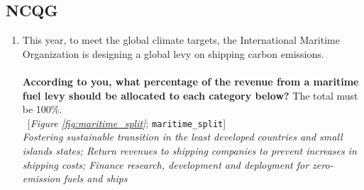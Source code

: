  \subsection*{NCQG} 
 \begin{enumerate}[resume] 
\item  \label{q:maritime_split} This year, to meet the global climate targets, the International Maritime Organization is designing a global levy on shipping carbon emissions.\\\\\textbf{According to you, what percentage of the revenue from a maritime fuel levy should be allocated to each category below?} The total must be 100\%.\\ 
~[\textit{Figure \ref{fig:maritime_split}}; 
\verb|maritime_split|]
  \\ \textit{Fostering sustainable transition in the least developed countries and small islands states; Return revenues to shipping companies to prevent increases in shipping costs; Finance research, development and deployment for zero-emission fuels and ships}


\end{enumerate}
